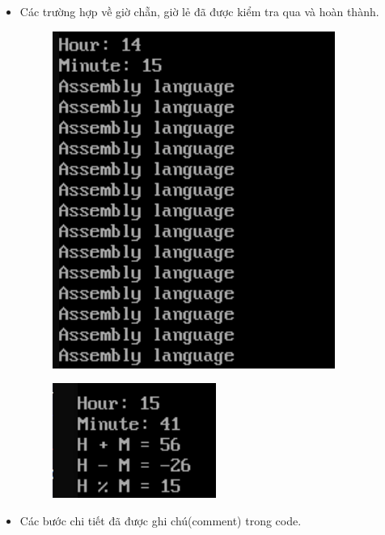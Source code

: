 \documentclass[12pt, a4paper]{article}
\begin{document}
\begin{itemize}
\begin{itemize}
    \end{itemize}
    \item Các trường hợp về giờ chẵn, giờ lẻ đã được kiểm tra qua và hoàn thành.
    \begin{figure}[H]
        \begin{center}
            \includegraphics[scale = 2]{GioChan.png}
        \end{center}
    \end{figure}
    \begin{figure}[H]
        \begin{center}
            \includegraphics[scale = 2]{GioLe.png}
        \end{center}
    \end{figure}
\end{itemize}
\begin{itemize}
    \item Các bước chi tiết đã được ghi chú(comment) trong code.
\end{itemize}
\end{document}
